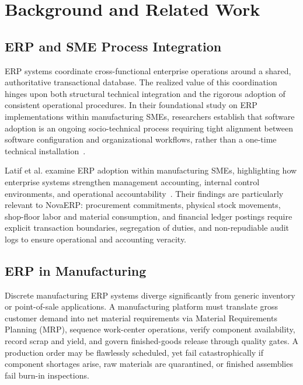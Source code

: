 \documentclass[conference]{IEEEtran}
\begin{document}
\section{Background and Related Work}

\subsection{ERP and SME Process Integration}
ERP systems coordinate cross-functional enterprise operations around a shared, authoritative transactional database. The realized value of this coordination hinges upon both structural technical integration and the rigorous adoption of consistent operational procedures. In their foundational study on ERP implementations within manufacturing SMEs, researchers establish that software adoption is an ongoing socio-technical process requiring tight alignment between software configuration and organizational workflows, rather than a one-time technical installation~\cite{b1}.

Latif et al. examine ERP adoption within manufacturing SMEs, highlighting how enterprise systems strengthen management accounting, internal control environments, and operational accountability~\cite{b3}. Their findings are particularly relevant to NovaERP: procurement commitments, physical stock movements, shop-floor labor and material consumption, and financial ledger postings require explicit transaction boundaries, segregation of duties, and non-repudiable audit logs to ensure operational and accounting veracity.

\subsection{ERP in Manufacturing}
Discrete manufacturing ERP systems diverge significantly from generic inventory or point-of-sale applications. A manufacturing platform must translate gross customer demand into net material requirements via Material Requirements Planning (MRP), sequence work-center operations, verify component availability, record scrap and yield, and govern finished-goods release through quality gates. A production order may be flawlessly scheduled, yet fail catastrophically if component shortages arise, raw materials are quarantined, or finished assemblies fail burn-in inspections.
\end{document}

